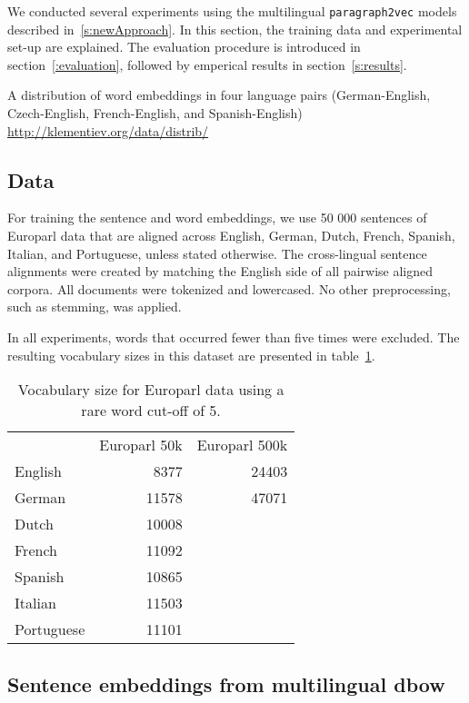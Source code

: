 
We conducted several experiments using the multilingual \texttt{paragraph2vec} models described in~\ref{s:newApproach}. In this section, the training data and experimental set-up are explained. The evaluation procedure is introduced in section~\ref{:evaluation}, followed by emperical results in section~\ref{s:results}.


A distribution of word embeddings in four language pairs (German-English, Czech-English, French-English, and Spanish-English) \url{http://klementiev.org/data/distrib/}


\subsection{Data}
For training the sentence and word embeddings, we use 50 000 sentences of Europarl data that are aligned across English, German, Dutch, French, Spanish, Italian, and Portuguese, unless stated otherwise. The cross-lingual sentence alignments were created by matching the English side of all pairwise aligned corpora.
All documents were tokenized and lowercased. No other preprocessing, such as stemming, was applied.


In all experiments, words that occurred fewer than five times were excluded.
The resulting vocabulary sizes in this dataset are presented  in table~\ref{t:vocabularies}.

\begin{table}
\center
\begin{tabular}{l r r}
		&Europarl 50k 	&Europarl 500k\\
English	&8377			&24403	\\	
German	&11578		&47071	\\
Dutch		&10008				\\
French	&11092				\\	
Spanish	&10865				\\
Italian		&11503				\\
Portuguese	&11101				\\
\end{tabular}
\caption{Vocabulary size for Europarl data using a rare word cut-off of 5.}
\label{t:vocabularies}
\end{table}


\subsection{Sentence embeddings from multilingual dbow}

